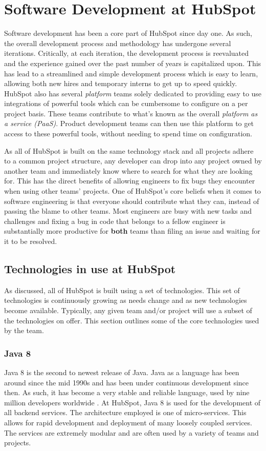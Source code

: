 \chapter{Software Development at HubSpot}
Software development has been a core part of HubSpot since day one. As such, the overall development process and methodology has undergone several iterations. Critically, at each iteration, the development process is reevaluated and the experience gained over the past number of years is capitalized upon. This has lead to a streamlined and simple development process which is easy to learn, allowing both new hires and temporary interns to get up to speed quickly. HubSpot also has several \textit{platform} teams solely dedicated to providing easy to use integrations of powerful tools which can be cumbersome to configure on a per project basis. These teams contribute to what's known as the overall \textit{platform as a service (PaaS)}. Product development teams can then use this platform to get access to these powerful tools, without needing to spend time on configuration.

As all of HubSpot is built on the same technology stack and all projects adhere to a common project structure, any developer can drop into any project owned by another team and immediately know where to search for what they are looking for. This has the direct benefits of allowing engineers to fix bugs they encounter when using other teams' projects. One of HubSpot's core beliefs when it comes to software engineering is that everyone should contribute what they can, instead of passing the blame to other teams. Most engineers are busy with new tasks and challenges and fixing a bug in code that belongs to a fellow engineer is substantially more productive for \textbf{both} teams than filing an issue and waiting for it to be resolved. 

\section{Technologies in use at HubSpot}
As discussed, all of HubSpot is built using a set of technologies. This set of technologies is continuously growing as needs change and as new technologies become available. Typically, any given team and/or project will use a subset of the technologies on offer. This section outlines some of the core technologies used by the \team{} team. 
\subsection{Java 8}
Java 8 is the second to newest release of Java. Java as a language has been around since the mid 1990s and has been under continuous development since then. As such, it has become a very stable and reliable language, used by nine million developers worldwide \cite{java9Million}. At HubSpot, Java 8 is used for the development of all backend services. The architecture employed is one of micro-services. This allows for rapid development and deployment of many loosely coupled services. The services are extremely modular and are often used by a variety of teams and projects. 

